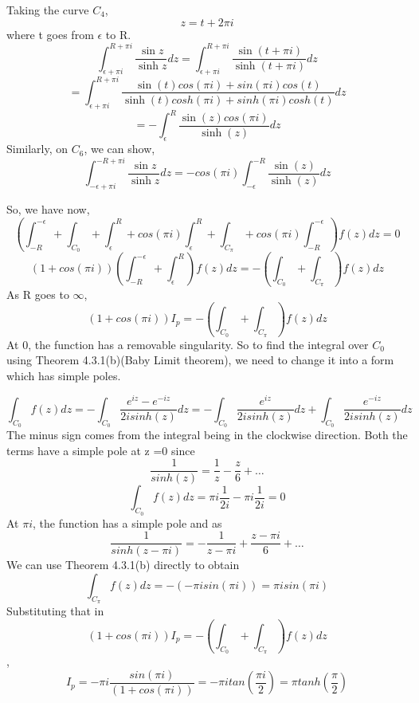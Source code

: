 \documentclass[a4paper]{article}
\begin{document}
\begin{enumerate}
 Taking the curve $C_4$,
 \[z = t+ 2\pi i \]
 where t goes from $\epsilon$ to R.
\[\int_{\epsilon + \pi i}^{R+ \pi i} \frac{\sin z}{\sinh z}dz =\int_{\epsilon + \pi i}^{R+\pi i} \frac{\sin (t+ \pi i )}{\sinh (t+ \pi i )}dz  \]
\[=\int_{\epsilon + \pi i}^{R+\pi i} \frac{\sin (t)cos(\pi i)+sin(\pi i)cos(t)}{\sinh (t)cosh(\pi i)+sinh(\pi i)cosh(t)}dz\]
\[=-\int_{\epsilon}^{R} \frac{\sin (z)cos(\pi i)}{\sinh (z)}dz\]
Similarly, on $C_6$, we can show,
\[\int_{-\epsilon + \pi i}^{-R+ \pi i} \frac{\sin z}{\sinh z}dz=-cos(\pi i)\int_{-\epsilon}^{-R} \frac{\sin (z)}{\sinh (z)}dz\]

So, we have now,
 \[\left(\int_{-R}^{-\epsilon} +\int_{C_0}+\int_{\epsilon}^{R} +cos(\pi i) \int_{\epsilon}^{R} +\int_{C_{\pi}} +cos(\pi i) \int_{-R}^{-\epsilon}\right) f(z)dz= 0\]
  \[(1+cos(\pi i))\left(\int_{-R}^{-\epsilon} +\int_{\epsilon}^{R} \right) f(z)dz=-\left(\int_{C_0} +\int_{C_{\pi}}\right) f(z)dz\]
 As R goes to $\infty$,
 \[(1+cos(\pi i)) I_p = -\left(\int_{C_0} +\int_{C_{\pi}}\right) f(z)dz \]
 At 0, the function has a removable singularity. So to find the integral over $C_0$ using Theorem 4.3.1(b)(Baby Limit theorem), we need to change it into a form which has simple poles.
 
 \[\int_{C_0} f(z)dz= -\int_{C_0} \frac{e^{iz}-e^{-iz}}{2i sinh(z)} dz = -\int_{C_0} \frac{e^{iz}}{2i sinh(z)} dz+ \int_{C_0} \frac{e^{-iz}}{2i sinh(z)} dz\]
  The minus sign comes from the integral being in the clockwise direction.
 Both the terms have a simple pole at z =0 since
 \[ \frac{1}{sinh(z)}= \frac{1}{z} - \frac{z}{6}+ \ldots\]
  \[\int_{C_0} f(z)dz= \pi i \frac{1}{2i} - \pi i \frac{1}{2i} =0\]
  At $\pi i$, the function has a simple pole and as 
   \[ \frac{1}{sinh(z-\pi i)}= -\frac{1}{z-\pi i} + \frac{z-\pi i}{6}+ \ldots\]
  We can use Theorem 4.3.1(b) directly to obtain
    \[\int_{C_{\pi}} f(z)dz=  - (-\pi i sin(\pi i)) =\pi i sin(\pi i) \]
   Substituting that in 
    \[(1+cos(\pi i)) I_p = -\left(\int_{C_0} +\int_{C_{\pi}}\right) f(z)dz \],
     \[I_p = - \pi i \frac{sin(\pi i)}{(1+cos(\pi i)) } =-\pi i tan(\frac{\pi i}{2})=\pi  tanh(\frac{\pi }{2})  \]

	\end{enumerate} 
\end{document}

